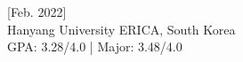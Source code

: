 [Feb. 2022] \\
\small{Hanyang University ERICA, South Korea} \\
\small{GPA: 3.28/4.0 | Major: 3.48/4.0}